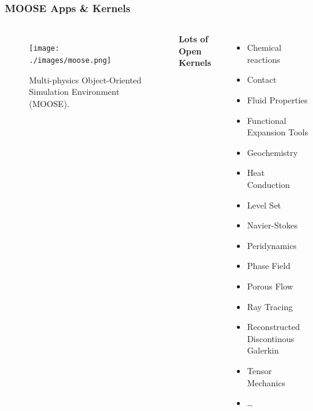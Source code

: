 \begin{frame}
        \frametitle{MOOSE Apps \& Kernels}
  \begin{columns}
    \column[t]{6cm}
  \begin{figure}[t]
     \vspace{-0.25in}
       \hspace*{-0.25in}
       \texttt{[image: ./images/moose.png]}
            \caption{Multi-physics Object-Oriented Simulation Environment (MOOSE).}
  \end{figure}
        \column[t]{4cm}
          \textbf{Lots of Open Kernels}
           \footnotesize{\begin{itemize} 
                \item Chemical reactions
                \item Contact
                \item Fluid Properties
                \item Functional Expansion Tools
                \item Geochemistry
                \item Heat Conduction
                \item Level Set
                \item Navier-Stokes
                \item Peridynamics
                \item Phase Field
                \item Porous Flow
                \item Ray Tracing
                \item Reconstructed Discontinous Galerkin
                \item Tensor Mechanics
                \item \ldots
          \end{itemize}
          }
  \end{columns}
\end{frame}


